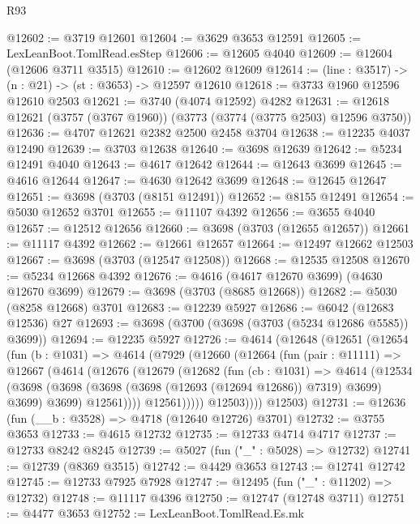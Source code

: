 \begin{lexlean}{R93}
\begin{coremodule}
@12602 := @3719 @12601
@12604 := @3629 @3653 @12591
@12605 := LexLeanBoot.TomlRead.esStep
@12606 := @12605 @4040
@12609 := @12604 (@12606 @3711 @3515)
@12610 := @12602 @12609
@12614 := (line : @3517) -> (n : @21) -> (st : @3653) -> @12597 @12610
@12618 := @3733 @1960 @12596 @12610 @2503
@12621 := @3740 (@4074 @12592) @4282
@12631 := @12618 @12621 (@3757 (@3767 @1960)) (@3773 (@3774 (@3775 @2503) @12596 @3750))
@12636 := @4707 @12621 @2382 @2500 @2458 @3704
@12638 := @12235 @4037 @12490
@12639 := @3703 @12638
@12640 := @3698 @12639
@12642 := @5234 @12491 @4040
@12643 := @4617 @12642
@12644 := @12643 @3699
@12645 := @4616 @12644
@12647 := @4630 @12642 @3699
@12648 := @12645 @12647
@12651 := @3698 (@3703 (@8151 @12491))
@12652 := @8155 @12491
@12654 := @5030 @12652 @3701
@12655 := @11107 @4392
@12656 := @3655 @4040
@12657 := @12512 @12656
@12660 := @3698 (@3703 (@12655 @12657))
@12661 := @11117 @4392
@12662 := @12661 @12657
@12664 := @12497 @12662 @12503
@12667 := @3698 (@3703 (@12547 @12508))
@12668 := @12535 @12508
@12670 := @5234 @12668 @4392
@12676 := @4616 (@4617 @12670 @3699) (@4630 @12670 @3699)
@12679 := @3698 (@3703 (@8685 @12668))
@12682 := @5030 (@8258 @12668) @3701
@12683 := @12239 @5927
@12686 := @6042 (@12683 @12536) @27
@12693 := @3698 (@3700 (@3698 (@3703 (@5234 @12686 @5585)) @3699))
@12694 := @12235 @5927
@12726 := @4614
    (@12648
      (@12651
        (@12654
          (fun (b : @1031) =>
          @4614
            (@7929
              (@12660
                (@12664
                  (fun (pair : @11111) =>
                  @12667
                    (@4614
                      (@12676
                        (@12679
                          (@12682
                            (fun (cb : @1031) =>
                            @4614
                              (@12534
                                (@3698
                                  (@3698 (@3698 (@3698 (@12693 (@12694 @12686)) @7319) @3699) @3699)
                                  @3699)
                                @12561))))
                        @12561)))))
              @12503))))
      @12503)
@12731 := @12636 (fun (__b : @3528) => @4718 (@12640 @12726) @3701)
@12732 := @3755 @3653
@12733 := @4615 @12732
@12735 := @12733 @4714 @4717
@12737 := @12733 @8242 @8245
@12739 := @5027 (fun ("_" : @5028) => @12732)
@12741 := @12739 (@8369 @3515)
@12742 := @4429 @3653
@12743 := @12741 @12742
@12745 := @12733 @7925 @7928
@12747 := @12495 (fun ("_" : @11202) => @12732)
@12748 := @11117 @4396
@12750 := @12747 (@12748 @3711)
@12751 := @4477 @3653
@12752 := LexLeanBoot.TomlRead.Es.mk

\end{coremodule}
\end{lexlean}
